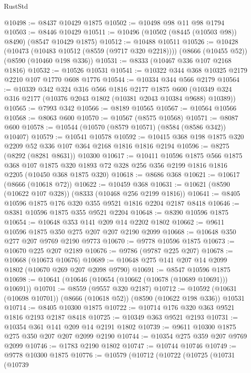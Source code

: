 \begin{lexlean}{RustStd}
\begin{coremodule}
@10498 := @8437 @10429 @1875
@10502 := @10498 @98 @11 @98 @1794
@10503 := @8446 @10429
@10511 := @10496 (@10502 (@8445 (@10503 @98)) @8490) (@8547 @10429 @1875)
@10512 := @10488 @10511
@10526 := @10428
    (@10473 (@10483 @10512 (@8559 (@9717 @320 @2218))))
    (@8666 (@10455 @52))
    (@8590 (@10460 @198 @336))
@10531 := @8333 (@10467 @336 @107 @2168 @1816)
@10532 := @10526 @10531
@10541 := @10322 @344 @368 @10325 @2179 @2210 @107 @1770 @608 @1776
@10544 := @10334 @344 @566 @2179
@10564 := @10339
    @342
    @324
    @316
    @566
    @1816
    @2177
    @1875
    @600
    (@10349 @324 @316 @2177 (@10376 @2043 @1802 (@10381 @2043 @10384 @9688) @10389))
@10565 := @7993 @342
@10566 := @8189 @10565
@10567 := @10564 @10566
@10568 := @8063 @600
@10570 := @10567 (@8575 @10568)
@10571 := @8087 @600
@10578 := @10544 (@10570 (@8579 @10571) (@8584 (@8586 @342)) @10407)
@10579 := @10541 @10578
@10592 := @10415 @368 @198 @1875 @320 @2209 @52 @336 @107 @364 @2168 @1816 @1816 @2194
@10596 := @8275 (@8292 (@8281 @8631)) @10300
@10617 := @10411
    @10596
    @1875
    @566
    @1875
    @368
    @107
    @1875
    @320
    @1893
    @72
    @328
    @256
    @356
    @2199
    @1816
    @1816
    @2205
    (@10450 @368 @1875 @320)
@10618 := @8686 @368
@10621 := @10617 (@8666 (@10618 @72))
@10622 := @10459 @368
@10631 := @10621 (@8590 (@10622 @107 @328)) (@8333 (@10468 @256 @2199 @1816))
@10641 := @8405 @10596 @1875 @176 @320 @355 @9521 @1816 @2204 @2187 @8418
@10646 := @8381 @10596 @1875 @355 @9521 @2204
@10648 := @8390 @10596 @1875
@10654 := @10648 @353 @141 @209 @14 @2202 @1802
@10662 := @9611 @10596 @1875 @350 @275 @207 @207 @2190 @2099
@10668 := @10648 @350 @277 @207 @9769 @2190 @9773
@10670 := @9778 @10596 @1875
@10673 := @10670 @225 @207 @2189
@10676 := @9786 (@9787 @225 @207)
@10678 := @10668 (@10673 @10676)
@10689 := @10648 @275 @141 @207 @14 @2099 @1802 (@10670 @269 @207 @2098 @9790)
@10691 := @8547 @10596 @1875
@10698 := @10641 (@10646 (@10654 (@10662 (@10678 (@10689 @10691))) @10691))
@10701 := @8559 (@9557 @320 @2187)
@10712 := @10592 (@10631 (@10698 @10701)) (@8666 (@10618 @52)) (@8590 (@10622 @198 @336)) @10531
@10714 := @8405 @10300 @1875
@10722 := @10714 @176 @320 @363 @9521 @1816 @2193 @2187 @8418
@10725 := @10349 @363 @9521 @2193
@10731 := @10354 @361 @141 @209 @14 @2191 @1802
@10739 := @9611 @10300 @1875 @275 @350 @207 @207 @2099 @2190
@10744 := @10354 @275 @359 @207 @9769 @2099
@10746 := @1783 @2190 @1802
@10747 := @10744 @10746
@10749 := @9778 @10300 @1875
@10776 := @10579
    (@10712
      (@10722
        (@10725
          (@10731
            (@10739

\end{coremodule}
\end{lexlean}
